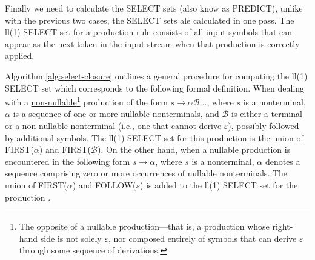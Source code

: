 Finally we need to calculate the SELECT sets (also know as PREDICT), unlike with the previous two cases, the SELECT sets ale calculated in one pass. The \gls{ll}(1) SELECT set for a production rule consists of all input symbols that can appear as the next token in the input stream when that production is correctly applied.



\begingroup
\vspace{1.5em}
\begin{algorithm}[H]
  \setlength{\algomargin}{1.5em}
  
  \caption{The \gls{ll}(1) SELECT algorithm.}
  \label{alg:select-closure}
\end{algorithm}
\vspace{1.5em}
\endgroup

Algorithm \ref{alg:select-closure} outlines a general procedure for computing the \gls{ll}(1) SELECT set which corresponds to the following formal definition. When dealing with a \underline{non-nullable}\footnote{The opposite of a nullable production—that is, a production whose right-hand side is not solely $\varepsilon$, nor composed entirely of symbols that can derive $\varepsilon$ through some sequence of derivations.
} production of the form $s\rightarrow \alpha \mathcal{B} \dots$, where $s$ is a nonterminal, $\alpha$ is a sequence of one or more nullable nonterminals, and $\mathcal{B}$ is either a terminal or a non-nullable nonterminal (i.e., one that cannot derive $\varepsilon$), possibly followed by additional symbols. The \gls{ll}(1) SELECT set for this production is the union of FIRST($\alpha$) and FIRST($\mathcal{B}$).
On the other hand, when a nullable production is encountered in the following form $s\rightarrow \alpha$, where $s$ is a nonterminal, $\alpha$ denotes a sequence comprising zero or more occurrences of nullable nonterminals. The union of FIRST($\alpha$) and FOLLOW($s$) is added to the \gls{ll}(1) SELECT set for the production \cite[Chapter~4.7.3]{Holub_1990}.



